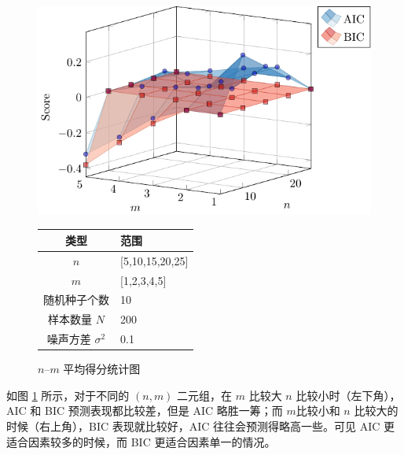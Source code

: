     \begin{figure}[b]
        \begin{minipage}[c]{.5\linewidth}
            \centering
            \includegraphics[width=\linewidth]{fig/nm.pdf}
            \caption{$n$--$m$ 平均得分统计图}\label{fig:nm}
        \end{minipage}
        \begin{minipage}[b]{.5\linewidth}
            \centering
            \begin{tabular}{cl}
                \toprule
                类型 & 范围 \\
                \midrule
                $n$ & [5,10,15,20,25] \\
                $m$ & [1,2,3,4,5] \\
                随机种子个数 & 10 \\
                \midrule
                样本数量 $N$ & 200 \\
                噪声方差 $\sigma^2$ & 0.1 \\
                \bottomrule
            \end{tabular}
        \end{minipage}
    \end{figure}

    如图 \ref{fig:nm} 所示，对于不同的 $(n,m)$ 二元组，在 $m$ 比较大 $n$ 比较小时（左下角），AIC 和 BIC 预测表现都比较差，但是 AIC 略胜一筹；而 $m$比较小和 $n$ 比较大的时候（右上角），BIC 表现就比较好，AIC 往往会预测得略高一些。可见 AIC 更适合因素较多的时候，而 BIC 更适合因素单一的情况。


